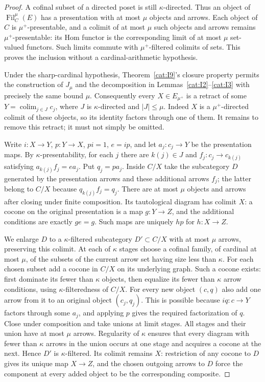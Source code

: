 \begin{proof}
A cofinal subset of a directed poset is still $\kappa$-directed.  Thus
an object of $\operatorname{Fil}^{\mu}_C(E)$ has a presentation with at
most $\mu$ objects and arrows.  Each object of $C$ is
$\mu^+$-presentable, and a colimit of at most $\mu$ such objects and
arrows remains $\mu^+$-presentable: its Hom functor is the corresponding
limit of at most $\mu$ set-valued functors.  Such limits commute with
$\mu^+$-filtered colimits of sets.  This proves the inclusion without
a cardinal-arithmetic hypothesis.

Under the sharp-cardinal hypothesis, Theorem~\ref{cat:I9}'s closure
property permits the construction of $J_\mu$ and the decomposition in
Lemmas~\ref{cat:I2}--\ref{cat:I3} with precisely the same bound $\mu$.
Consequently every $X\in E_{\mu^+}$ is a retract of some
$Y=\operatorname{colim}_{j\in J}c_j$, where $J$ is $\kappa$-directed
and $|J|\leq\mu$.  Indeed $X$ is a $\mu^+$-directed colimit of these
objects, so its identity factors through one of them.
It remains to remove this retract; it must not simply be omitted.

Write $i:X\to Y$, $p:Y\to X$, $pi=1$, $e=ip$, and let
$a_j:c_j\to Y$ be the presentation maps.  By
$\kappa$-presentability, for each $j$ there are $k(j)\in J$ and
$f_j:c_j\to c_{k(j)}$ satisfying $a_{k(j)}f_j=ea_j$.
Put $q_j=pa_j$.  Inside $C/X$ take the subcategory $D$ generated by
the presentation arrows and these additional arrows $f_j$; the latter
belong to $C/X$ because $q_{k(j)}f_j=q_j$.  There are at most $\mu$
objects and arrows after closing under finite composition.  Its
tautological diagram has colimit $X$: a cocone on the original
presentation is a map $g:Y\to Z$, and the additional conditions are
exactly $ge=g$.  Such maps are uniquely $hp$ for $h:X\to Z$.

We enlarge $D$ to a $\kappa$-filtered subcategory $D'\subset C/X$
with at most $\mu$ arrows, preserving this colimit.  At each of
$\kappa$ stages choose a cofinal family, of cardinal at most $\mu$,
of the subsets of the current arrow set having size less than
$\kappa$.  For each chosen subset add a cocone in $C/X$ on its
underlying graph.  Such a cocone exists: first dominate its fewer than
$\kappa$ objects, then equalize its fewer than $\kappa$ arrow
conditions, using $\kappa$-filteredness of $C/X$.
For every new object $(c,q)$ also add one arrow from it to an original
object $(c_j,q_j)$.  This is possible because $iq:c\to Y$ factors
through some $a_j$, and applying $p$ gives the required factorization
of $q$.  Close under composition and take unions at limit stages.
All stages and their union have at most $\mu$ arrows.
Regularity of $\kappa$ ensures that every diagram with fewer than
$\kappa$ arrows in the union occurs at one stage and acquires a cocone
at the next.  Hence $D'$ is $\kappa$-filtered.
Its colimit remains $X$: restriction of any cocone to $D$ gives its
unique map $X\to Z$, and the chosen outgoing arrows to $D$ force
the component at every added object to be the corresponding composite.


\end{proof}
